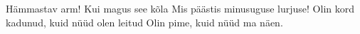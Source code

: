 Hämmastav arm!
Kui magus see kõla
Mis päästis minusuguse lurjuse!
Olin kord kadunud,
kuid nüüd olen leitud
Olin pime, kuid nüüd ma näen. 
